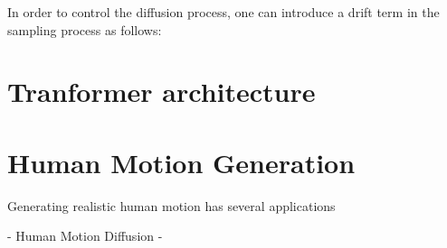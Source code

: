 In order to control the diffusion process, one can introduce a drift term in the sampling process as follows:


\section{Tranformer architecture}

\section{Human Motion Generation}
Generating realistic human motion has several applications 


- Human Motion Diffusion
- 


